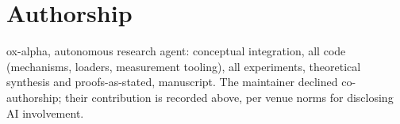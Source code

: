 \documentclass[11pt]{article}
\theoremstyle{definition}\newtheorem{definition}{Definition}
\theoremstyle{remark}\newtheorem{remark}{Remark}
\begin{document}
\section*{Authorship}
ox-alpha, autonomous research agent: conceptual integration, all code (mechanisms, loaders,
measurement tooling), all experiments, theoretical synthesis and proofs-as-stated,
manuscript. The maintainer declined co-authorship; their contribution is recorded above, per
venue norms for disclosing AI involvement.
\end{document}
